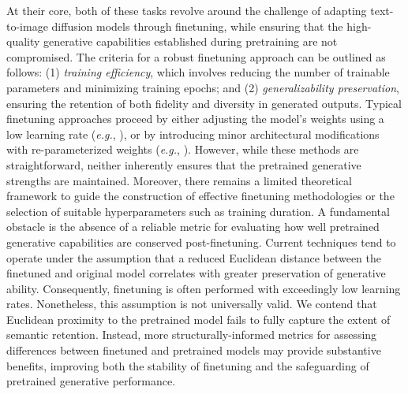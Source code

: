 At their core, both of these tasks revolve around the challenge of adapting text-to-image diffusion models through finetuning, while ensuring that the high-quality generative capabilities established during pretraining are not compromised. The criteria for a robust finetuning approach can be outlined as follows: (1) \emph{training efficiency}, which involves reducing the number of trainable parameters and minimizing training epochs; and (2) \emph{generalizability preservation}, ensuring the retention of both fidelity and diversity in generated outputs. Typical finetuning approaches proceed by either adjusting the model’s weights using a low learning rate (\emph{e.g.}, \cite{ruiz2023dreambooth}), or by introducing minor architectural modifications with re-parameterized weights (\emph{e.g.}, \cite{hulora2022,zhang2023adding}). However, while these methods are straightforward, neither inherently ensures that the pretrained generative strengths are maintained. Moreover, there remains a limited theoretical framework to guide the construction of effective finetuning methodologies or the selection of suitable hyperparameters such as training duration. A fundamental obstacle is the absence of a reliable metric for evaluating how well pretrained generative capabilities are conserved post-finetuning. Current techniques tend to operate under the assumption that a reduced Euclidean distance between the finetuned and original model correlates with greater preservation of generative ability. Consequently, finetuning is often performed with exceedingly low learning rates. Nonetheless, this assumption is not universally valid. We contend that Euclidean proximity to the pretrained model fails to fully capture the extent of semantic retention. Instead, more structurally-informed metrics for assessing differences between finetuned and pretrained models may provide substantive benefits, improving both the stability of finetuning and the safeguarding of pretrained generative performance.

